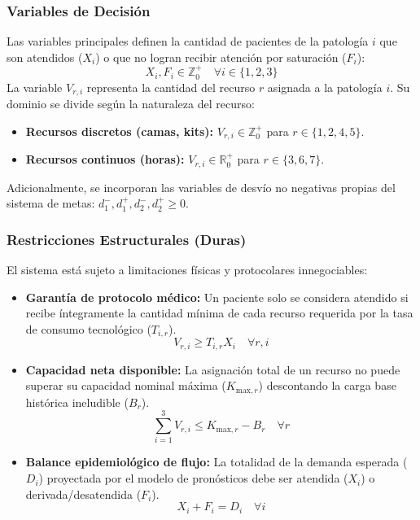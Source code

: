 \documentclass[conference]{IEEEtran}
\begin{document}
\subsubsection{Variables de Decisión}
Las variables principales definen la cantidad de pacientes de la patología $i$ que son atendidos ($X_i$) o que no logran recibir atención por saturación ($F_i$):
\begin{equation}
    X_i, F_i \in \mathbb{Z}_0^+ \quad \forall i \in \{1, 2, 3\}
\end{equation}
La variable $V_{r,i}$ representa la cantidad del recurso $r$ asignada a la patología $i$. Su dominio se divide según la naturaleza del recurso:
\begin{itemize}
    \item \textbf{Recursos discretos (camas, kits):} $V_{r,i} \in \mathbb{Z}_0^+$ para $r \in \{1, 2, 4, 5\}$.
    \item \textbf{Recursos continuos (horas):} $V_{r,i} \in \mathbb{R}_0^+$ para $r \in \{3, 6, 7\}$.
\end{itemize}
Adicionalmente, se incorporan las variables de desvío no negativas propias del sistema de metas: $d_1^-, d_1^+, d_2^-, d_2^+ \ge 0$.

\subsubsection{Restricciones Estructurales (Duras)}
El sistema está sujeto a limitaciones físicas y protocolares innegociables:
\begin{itemize}
    \item \textbf{Garantía de protocolo médico:} Un paciente solo se considera atendido si recibe íntegramente la cantidad mínima de cada recurso requerida por la tasa de consumo tecnológico ($T_{i,r}$).
          \begin{equation}
              V_{r,i} \ge T_{i,r} X_i \quad \forall r, i
          \end{equation}
    \item \textbf{Capacidad neta disponible:} La asignación total de un recurso no puede superar su capacidad nominal máxima ($K_{\text{max},r}$) descontando la carga base histórica ineludible ($B_r$).
          \begin{equation}
              \sum_{i=1}^{3} V_{r,i} \le K_{\text{max},r} - B_r \quad \forall r
          \end{equation}
    \item \textbf{Balance epidemiológico de flujo:} La totalidad de la demanda esperada ($D_i$) proyectada por el modelo de pronósticos debe ser atendida ($X_i$) o derivada/desatendida ($F_i$).
          \begin{equation}
              X_i + F_i = D_i \quad \forall i
          \end{equation}
\end{itemize}
\end{document}
